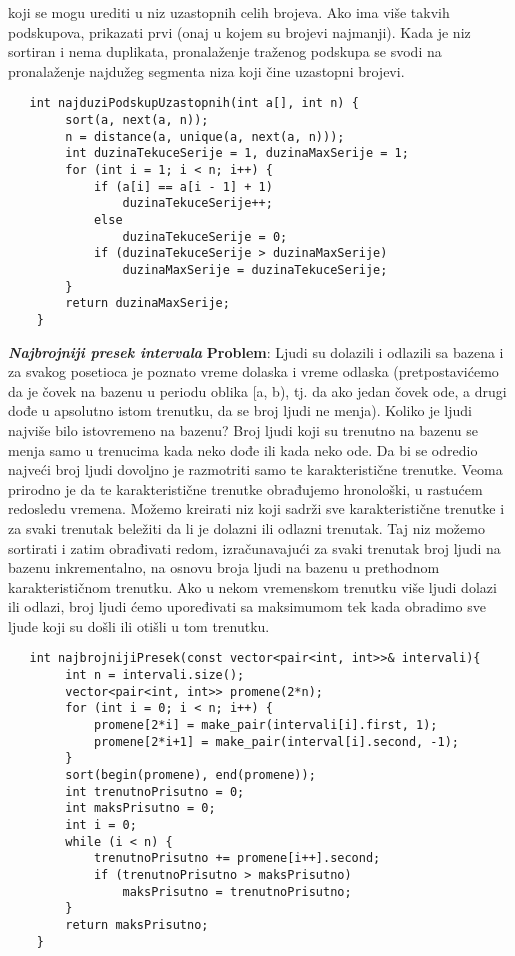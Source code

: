 \documentclass{article}
\begin{document}
koji se mogu urediti u niz uzastopnih celih brojeva. Ako ima
više takvih podskupova, prikazati prvi (onaj u kojem su brojevi najmanji).
\newline
Kada je niz sortiran i nema duplikata,
pronalaženje traženog podskupa se svodi na pronalaženje najdužeg segmenta
niza koji čine uzastopni brojevi.
\begin{lstlisting}
   int najduziPodskupUzastopnih(int a[], int n) {
        sort(a, next(a, n));
        n = distance(a, unique(a, next(a, n)));
        int duzinaTekuceSerije = 1, duzinaMaxSerije = 1;
        for (int i = 1; i < n; i++) {
            if (a[i] == a[i - 1] + 1)
                duzinaTekuceSerije++;
            else
                duzinaTekuceSerije = 0;
            if (duzinaTekuceSerije > duzinaMaxSerije)
                duzinaMaxSerije = duzinaTekuceSerije;
        }
        return duzinaMaxSerije;
    }
\end{lstlisting}
\textit{\textbf{Najbrojniji presek intervala}}
\vspace{0.1cm}\newline
\textbf{Problem}: Ljudi su dolazili i odlazili sa bazena i za svakog posetioca je poznato
vreme dolaska i vreme odlaska (pretpostavićemo da je čovek na bazenu u periodu
oblika [a, b), tj. da ako jedan čovek ode, a drugi dođe u apsolutno istom trenutku,
da se broj ljudi ne menja). Koliko je ljudi najviše bilo istovremeno na bazenu?
\newline
Broj ljudi koji su trenutno na bazenu se menja samo
u trenucima kada neko dođe ili kada neko ode. Da bi se odredio najveći broj ljudi
dovoljno je razmotriti samo te karakteristične trenutke. Veoma prirodno je da te
karakteristične trenutke obrađujemo hronološki, u rastućem redosledu vremena. Možemo kreirati niz koji sadrži sve karakteristične trenutke i za svaki trenutak beležiti da li je dolazni ili odlazni trenutak. Taj niz
možemo sortirati i zatim obrađivati redom, izračunavajući za svaki trenutak broj
ljudi na bazenu inkrementalno, na osnovu broja ljudi na bazenu u prethodnom
karakterističnom trenutku. Ako u nekom vremenskom trenutku više ljudi dolazi
ili odlazi, broj ljudi ćemo upoređivati sa maksimumom tek kada obradimo sve
ljude koji su došli ili otišli u tom trenutku.
\begin{lstlisting}
   int najbrojnijiPresek(const vector<pair<int, int>>& intervali){
        int n = intervali.size();
        vector<pair<int, int>> promene(2*n);
        for (int i = 0; i < n; i++) {
            promene[2*i] = make_pair(intervali[i].first, 1);
            promene[2*i+1] = make_pair(interval[i].second, -1);
        }
        sort(begin(promene), end(promene));
        int trenutnoPrisutno = 0;
        int maksPrisutno = 0;
        int i = 0;
        while (i < n) {
            trenutnoPrisutno += promene[i++].second;
            if (trenutnoPrisutno > maksPrisutno)
                maksPrisutno = trenutnoPrisutno;
        }
        return maksPrisutno;
    }
\end{lstlisting}
\end{document}
